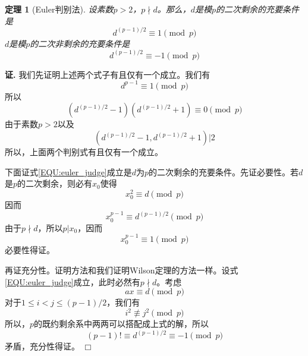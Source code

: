 \documentclass{ctexart}
\newtheorem{thrm}{定理}[section]
\renewenvironment{proof}[1][证]{\noindent \textbf{#1.} }{\hfill$\Box$}
\begin{document}
\begin{thrm}[Euler判别法]
设素数$p>2$，$p\nmid d$。那么，$d$是模$p$的二次剩余的充要条件是
\begin{equation}\label{EQU:euler_judge}
d^{(p-1)/2}\equiv 1\pmod{p}
\end{equation}
$d$是模$p$的二次非剩余的充要条件是
\begin{equation}
d^{(p-1)/2}\equiv -1\pmod{p}
\end{equation}
\end{thrm}
\begin{proof}
我们先证明上述两个式子有且仅有一个成立。我们有
\begin{displaymath}
d^{p-1}\equiv 1\pmod{p}
\end{displaymath}
所以
\begin{displaymath}
(d^{(p-1)/2}-1)(d^{(p-1)/2}+1)\equiv 0\pmod{p}
\end{displaymath}
由于素数$p>2$以及
\begin{displaymath}
(d^{(p-1)/2}-1,d^{(p-1)/2}+1)|2
\end{displaymath}
所以，上面两个判别式有且仅有一个成立。

下面证式\ref{EQU:euler_judge}成立是$d$为$p$的二次剩余的充要条件。先证必要性。若$d$是$p$的二次剩余，则必有$x_0$使得
\begin{displaymath}
x_0^2\equiv d\pmod{p}
\end{displaymath}
因而
\begin{displaymath}
x_0^{p-1}\equiv d^{(p-1)/2}\pmod{p}
\end{displaymath}
由于$p\nmid d$，所以$p|x_0$，因而
\begin{displaymath}
x_0^{p-1}\equiv 1\pmod{p}
\end{displaymath}
必要性得证。

再证充分性。证明方法和我们证明Wilson定理的方法一样。设式\ref{EQU:euler_judge}成立，此时必然有$p\nmid d$。考虑
\begin{displaymath}
ax\equiv d\pmod{p}
\end{displaymath}
对于$1\leq i<j\leq (p-1)/2$，我们有
\begin{displaymath}
i^2\not\equiv j^2\pmod{p}
\end{displaymath}
所以，$p$的既约剩余系中两两可以搭配成上式的解，所以
\begin{displaymath}
(p-1)!\equiv d^{(p-1)/2}\equiv -1\pmod{p}
\end{displaymath}
矛盾，充分性得证。
\end{proof}
\end{document}
